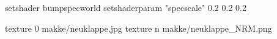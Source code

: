 setshader bumpspecworld
setshaderparam "specscale" 0.2 0.2 0.2

texture 0 makke/neuklappe.jpg
texture n makke/neuklappe_NRM.png
